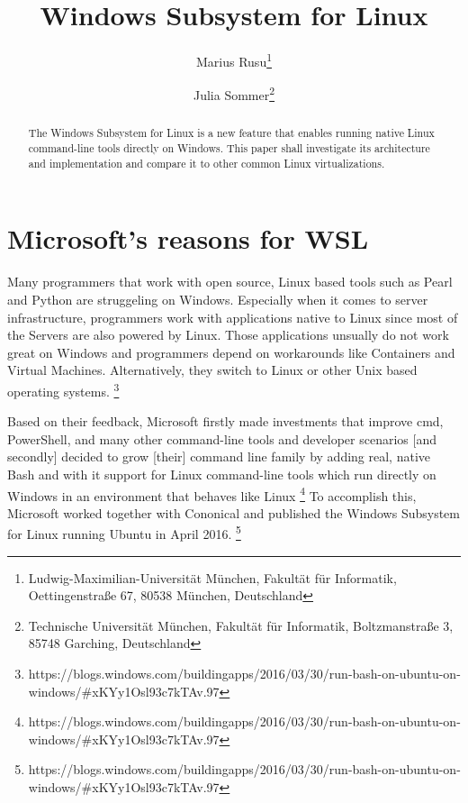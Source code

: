 \documentclass[utf8,biblatex]{lni}
\begin{document}
\title[WSL]{Windows Subsystem for Linux}
\author[Marius Rusu \and Julia Sommer]
{Marius Rusu\footnote{Ludwig-Maximilian-Universität München, Fakultät für Informatik, Oettingenstraße 67, 80538 München, Deutschland } \and
 Julia Sommer\footnote{Technische Universität München, Fakultät für Informatik, Boltzmanstraße 3, 85748 Garching, Deutschland }}
\maketitle

\begin{abstract}
The Windows Subsystem for Linux is a new feature that enables running native Linux command-line tools directly on Windows. This paper shall investigate its architecture and implementation and compare it to other common Linux virtualizations.
\end{abstract}


\section{Microsoft's reasons for WSL}

Many programmers that work with open source, Linux based tools such as Pearl and Python are struggeling on Windows. Especially when it comes to server infrastructure, programmers work with applications native to Linux since most of the Servers are also powered by Linux. Those applications unsually do not work great on Windows and programmers depend on workarounds like Containers and Virtual Machines. Alternatively, they switch to Linux or other Unix based operating systems. \footnote{https://blogs.windows.com/buildingapps/2016/03/30/run-bash-on-ubuntu-on-windows/#xKYy1Osl93c7kTAv.97}

Based on their feedback, Microsoft firstly \glqq made investments that improve cmd, PowerShell, and many other command-line tools and developer scenarios [and secondly] decided to grow [their] command line family by adding real, native Bash and with it support for Linux command-line tools which run directly on Windows in an environment that behaves like Linux \glqq \footnote{https://blogs.windows.com/buildingapps/2016/03/30/run-bash-on-ubuntu-on-windows/#xKYy1Osl93c7kTAv.97}
To accomplish this, Microsoft worked together with Cononical and published the Windows Subsystem for Linux running Ubuntu in April 2016. \footnote{https://blogs.windows.com/buildingapps/2016/03/30/run-bash-on-ubuntu-on-windows/#xKYy1Osl93c7kTAv.97}
\end{document}
